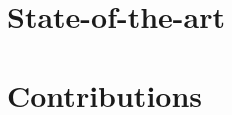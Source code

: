 \documentclass[12pt,a4paper]{memoir}
\begin{document}
	
	
\dominitoc 
\frontmatter






\newpage

\setcounter{tocdepth}{2}

\tableofcontents


\mainmatter




\part{State-of-the-art}

\setcounter{mtc}{2} 

\setcounter{mtc}{3} 


\part{Contributions}
\setcounter{mtc}{4} 

\setcounter{mtc}{5} 




\balance


\end{document}
